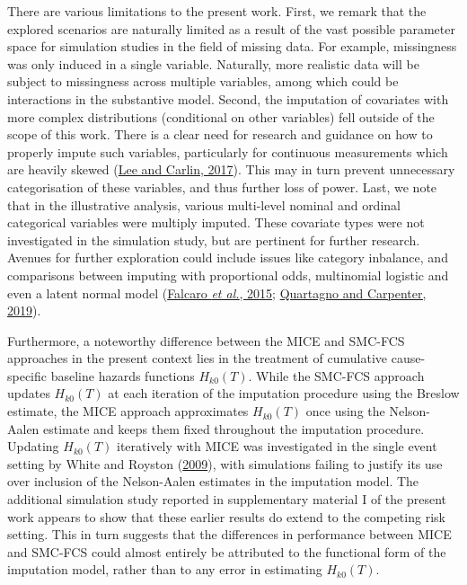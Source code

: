 \documentclass[
  letterpaper,
  DIV=11,
  numbers=noendperiod]{scrreprt}
\begin{document}
There are various limitations to the present work. First, we remark that
the explored scenarios are naturally limited as a result of the vast
possible parameter space for simulation studies in the field of missing
data. For example, missingness was only induced in a single variable.
Naturally, more realistic data will be subject to missingness across
multiple variables, among which could be interactions in the substantive
model. Second, the imputation of covariates with more complex
distributions (conditional on other variables) fell outside of the scope
of this work. There is a clear need for research and guidance on how to
properly impute such variables, particularly for continuous measurements
which are heavily skewed
(\protect\hyperlink{ref-leeMultipleImputationPresence2017}{Lee and
Carlin, 2017}). This may in turn prevent unnecessary categorisation of
these variables, and thus further loss of power. Last, we note that in
the illustrative analysis, various multi-level nominal and ordinal
categorical variables were multiply imputed. These covariate types were
not investigated in the simulation study, but are pertinent for further
research. Avenues for further exploration could include issues like
category inbalance, and comparisons between imputing with proportional
odds, multinomial logistic and even a latent normal model
(\protect\hyperlink{ref-falcaroEstimatingExcessHazard2015}{Falcaro
\emph{et al.}, 2015};
\protect\hyperlink{ref-quartagnoMultipleImputationDiscrete2019}{Quartagno
and Carpenter, 2019}).

Furthermore, a noteworthy difference between the MICE and SMC-FCS
approaches in the present context lies in the treatment of cumulative
cause-specific baseline hazards functions \(H_{k0}(T)\). While the
SMC-FCS approach updates \(H_{k0}(T)\) at each iteration of the
imputation procedure using the Breslow estimate, the MICE approach
approximates \(H_{k0}(T)\) once using the Nelson-Aalen estimate and
keeps them fixed throughout the imputation procedure. Updating
\(H_{k0}(T)\) iteratively with MICE was investigated in the single event
setting by White and Royston
(\protect\hyperlink{ref-whiteImputingMissingCovariate2009}{2009}), with
simulations failing to justify its use over inclusion of the
Nelson-Aalen estimates in the imputation model. The additional
simulation study reported in supplementary material I of the present
work appears to show that these earlier results do extend to the
competing risk setting. This in turn suggests that the differences in
performance between MICE and SMC-FCS could almost entirely be attributed
to the functional form of the imputation model, rather than to any error
in estimating \(H_{k0}(T)\).
\end{document}
